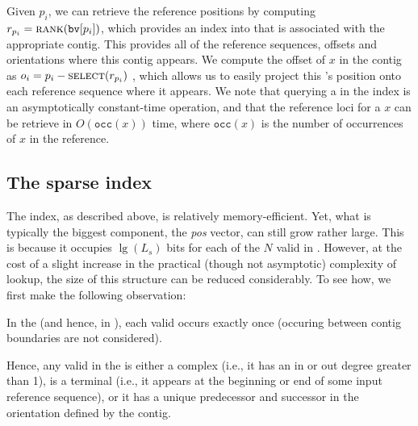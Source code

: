 Given $p_{i}$, we can retrieve the reference positions by computing $r_{p_i} =
\mbox{\sc rank}(\texttt{bv}[p_{i}])$, which provides an index into \ctab that is
associated with the appropriate contig. This provides all of the reference
sequences, offsets and orientations where this contig appears. We compute the
offset of \kmer $x$ in the contig as $o_{i} = p_{i} - \mbox{\sc select}(r_{p_i})$
,
which allows us to easily project this \kmer's position onto each reference
sequence where it appears. We note that querying a \kmer in the \pufferfish index is
an asymptotically constant-time operation, and that the reference loci for a
\kmer $x$ can be retrieve in $O(\texttt{occ}(x))$ time, where $\texttt{occ}(x)$
is the number of occurrences of $x$ in the reference.

\subsection*{The sparse \pufferfish index}

The \pufferfish index, as described above, is relatively memory-efficient. Yet, what
is typically the biggest component, the \emph{pos} vector, can still grow rather
large. This is because it occupies $\lg(L_s)$ bits for each of the $N$ valid
\kmers in \cseq. However, at the cost of a slight increase in the practical
(though not asymptotic) complexity of lookup, the size of this structure can be
reduced considerably. To see how, we first make the following observation:

\begin{observation}
  In the \ccdbg (and hence, in \cseq), each valid \kmer occurs exactly once (\kmers occuring between contig boundaries are not considered).
\end{observation}

Hence, any valid \kmer in the \ccdbg is either a complex \kmer (i.e., it has an
in or out degree greater than 1), is a terminal \kmer (i.e., it appears at the
beginning or end of some input reference sequence), or it has a unique
predecessor and successor in the orientation defined by the contig.

